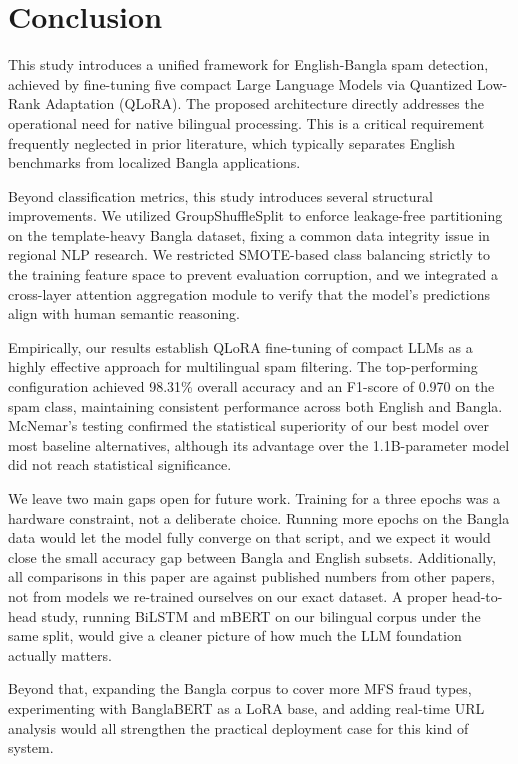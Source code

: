 \documentclass[journal]{IEEEtran}
\begin{document}
\balance
\section{Conclusion}

This study introduces a unified framework for English-Bangla spam detection, achieved by fine-tuning five compact Large Language Models via Quantized Low-Rank Adaptation (QLoRA). The proposed architecture directly addresses the operational need for native bilingual processing. This is a critical requirement frequently neglected in prior literature, which typically separates English benchmarks from localized Bangla applications.

Beyond classification metrics, this study introduces several structural improvements. We utilized GroupShuffleSplit to enforce leakage-free partitioning on the template-heavy Bangla dataset, fixing a common data integrity issue in regional NLP research. We restricted SMOTE-based class balancing strictly to the training feature space to prevent evaluation corruption, and we integrated a cross-layer attention aggregation module to verify that the model's predictions align with human semantic reasoning.

Empirically, our results establish QLoRA fine-tuning of compact LLMs as a highly effective approach for multilingual spam filtering. The top-performing configuration achieved 98.31\% overall accuracy and an F1-score of 0.970 on the spam class, maintaining consistent performance across both English and Bangla. McNemar's testing confirmed the statistical superiority of our best model over most baseline alternatives, although its advantage over the 1.1B-parameter model did not reach statistical significance.

We leave two main gaps open for future work. Training for a three epochs was a hardware constraint, not a deliberate choice. Running more epochs on the Bangla data would let the model fully converge on that script, and we expect it would close the small accuracy gap between Bangla and English subsets. Additionally, all comparisons in this paper are against published numbers from other papers, not from models we re-trained ourselves on our exact dataset. A proper head-to-head study, running BiLSTM and mBERT on our bilingual corpus under the same split, would give a cleaner picture of how much the LLM foundation actually matters.

Beyond that, expanding the Bangla corpus to cover more MFS fraud types, experimenting with BanglaBERT as a LoRA base, and adding real-time URL analysis would all strengthen the practical deployment case for this kind of system.



\end{document}
